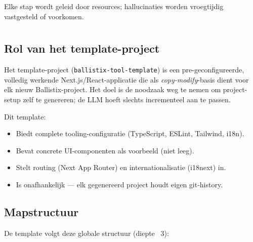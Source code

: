 Elke stap wordt geleid door resources; hallucinaties worden vroegtijdig vastgesteld of voorkomen.

\section{}
\label{sec:poc-template}

\subsection{Rol van het template-project}

Het template-project (\texttt{ballistix-tool-template}) is een pre-geconfigureerde, volledig werkende Next.js/React-applicatie die als \textit{copy-modify}-basis dient voor elk nieuw Ballistix-project. Het doel is de noodzaak weg te nemen om project-setup zelf te genereren; de LLM hoeft slechts incrementeel aan te passen.

Dit template:
\begin{itemize}
  \item Biedt complete tooling-configuratie (TypeScript, ESLint, Tailwind, i18n).
  \item Bevat concrete UI-componenten als voorbeeld (niet leeg).
  \item Stelt routing (Next App Router) en internationalisatie (i18next) in.
  \item Is onafhankelijk — elk gegenereerd project houdt eigen git-history.
\end{itemize}

\subsection{Mapstructuur}

De template volgt deze globale structuur (diepte ~3):

